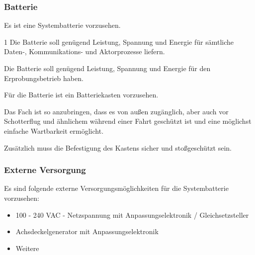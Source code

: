 \subsubsection{Batterie}
\begin{feat}
Es ist eine \gls{Systembatterie} vorzusehen.
\end{feat}
\begin{rem}[zu Anf. 10]1
Die Batterie soll genügend Leistung, Spannung und Energie für sämtliche Daten-, Kommunikations- und Aktorprozesse liefern.
\end{rem}
\begin{rem}[zu Anf. 11]
Die Batterie soll genügend Leistung, Spannung und Energie für den Erprobungsbetrieb haben.
\end{rem}
\begin{feat}
Für die Batterie ist ein Batteriekasten vorzusehen. 
\end{feat}
\begin{rem} [zu Anf. 12]
Das Fach ist so anzubringen, dass es von außen zugänglich, aber auch vor Schotterflug und ähnlichem während einer Fahrt geschützt ist und eine möglichst einfache Wartbarkeit ermöglicht.
\end{rem}
\begin{rem} [zu Anf. 12]
Zusätzlich muss die Befestigung des Kastens sicher und stoßgeschützt sein.
\end{rem}

\subsubsection{Externe Versorgung}
\begin{feat}
Es sind folgende externe Versorgungsmöglichkeiten für die \gls{Systembatterie} vorzusehen:
\begin{itemize}
    \item 100 - 240 VAC - Netzspannung mit Anpassungselektronik / Gleichsetzsteller
    \item Achsdeckelgenerator mit Anpassungselektronik
    \item Weitere
\end{itemize}
\end{feat}

